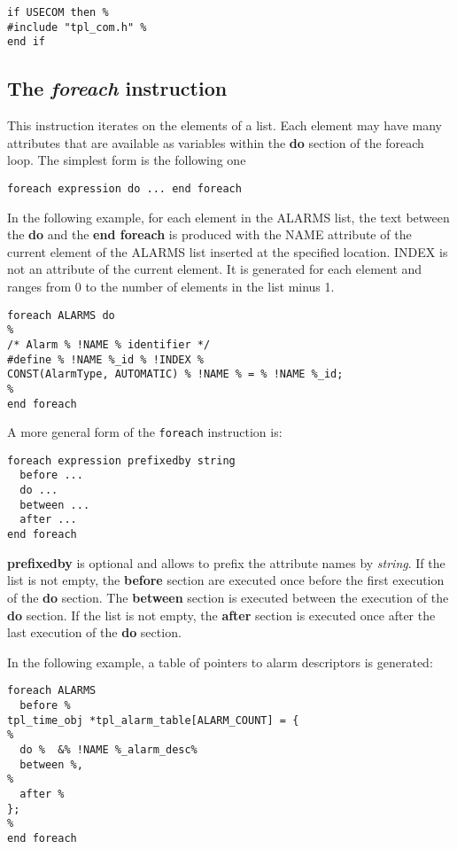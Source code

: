 \begin{lstlisting}
if USECOM then %
#include "tpl_com.h" %
end if
\end{lstlisting}

\subsection{The {\em foreach} instruction}

This instruction iterates on the elements of a list. Each element may have many attributes that are available as variables within the {\bf do} section of the foreach loop. The simplest form is the following one

\begin{lstlisting}
foreach expression do ... end foreach
\end{lstlisting}

In the following example, for each element in the ALARMS list, the text between the {\bf do} and the {\bf end foreach} is produced with the NAME attribute of the current element of the ALARMS list inserted at the specified location. INDEX is not an attribute of the current element. It is generated for each element and ranges from 0 to the number of elements in the list minus 1.
\begin{lstlisting}
foreach ALARMS do
%
/* Alarm % !NAME % identifier */
#define % !NAME %_id % !INDEX %
CONST(AlarmType, AUTOMATIC) % !NAME % = % !NAME %_id;
%
end foreach
\end{lstlisting}

A more general form of the {\tt foreach} instruction is:

\begin{lstlisting}
foreach expression prefixedby string
  before ...
  do ...
  between ...
  after ...
end foreach
\end{lstlisting}

{\bf prefixedby} is optional and allows to prefix the attribute names by {\em string}. If the list is not empty, the {\bf before} section are executed once before the first execution of the {\bf do} section. The {\bf between} section is executed between the execution of the {\bf do} section.  If the list is not empty, the {\bf after} section is executed once after the last execution of the {\bf do} section.

In the following example, a table of pointers to alarm descriptors is generated:

\begin{lstlisting}
foreach ALARMS
  before %
tpl_time_obj *tpl_alarm_table[ALARM_COUNT] = {
%
  do %  &% !NAME %_alarm_desc%
  between %,
%
  after %
};
%
end foreach
\end{lstlisting}

